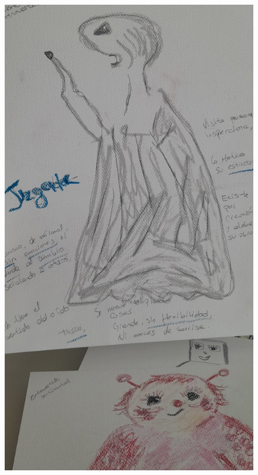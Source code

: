 \documentclass[12pt, a4paper, twoside]{book} %
\begin{document}
\begin{figure}[H]
	\centering
	\includegraphics[width=\textwidth]{./images/1f81324df3cf07.jpg}
\end{figure}
\end{document}
